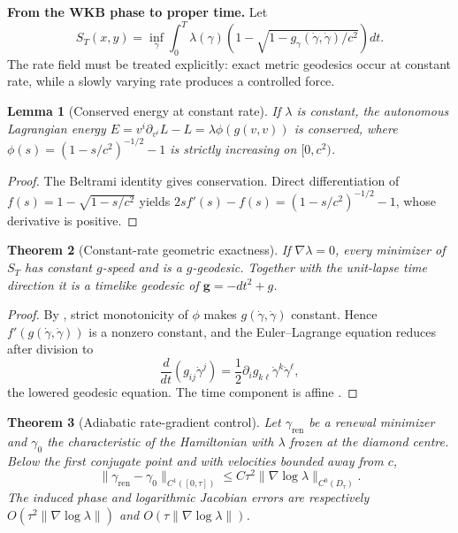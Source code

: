 \documentclass[11pt]{article}
\newtheorem{theorem}{Theorem}[section]
\newtheorem{lemma}[theorem]{Lemma}
\theoremstyle{definition}
\theoremstyle{remark}
\newcommand{\ren}{\mathrm{ren}}
\begin{document}
\medskip
\noindent\textbf{From the WKB phase to proper time.}
Let
\[
 S_T(x,y)=\inf_\gamma\int_0^T
 \lambda(\gamma)\left(1-\sqrt{1-g_\gamma(\dot\gamma,\dot\gamma)/c^2}\right)dt.
\]
The rate field must be treated explicitly: exact metric geodesics occur at constant
rate, while a slowly varying rate produces a controlled force.

\begin{lemma}[Conserved energy at constant rate]
\label{lem:constant-rate-energy}
If $\lambda$ is constant, the autonomous Lagrangian energy
$E=v^i\partial_{v^i}L-L=\lambda\phi(g(v,v))$ is conserved, where
$\phi(s)=(1-s/c^2)^{-1/2}-1$ is strictly increasing on $[0,c^2)$.
\end{lemma}

\begin{proof}
The Beltrami identity gives conservation.  Direct differentiation of
$f(s)=1-\sqrt{1-s/c^2}$ yields
$2sf'(s)-f(s)=(1-s/c^2)^{-1/2}-1$, whose derivative is positive.
\end{proof}

\begin{theorem}[Constant-rate geometric exactness]
\label{thm:constant-rate-geodesics}
If $\nabla\lambda=0$, every minimizer of $S_T$ has constant $g$-speed and is a
$g$-geodesic.  Together with the unit-lapse time direction it is a timelike
geodesic of $\mathbf g=-dt^2+g$.
\end{theorem}

\begin{proof}
By , strict monotonicity of $\phi$ makes
$g(\dot\gamma,\dot\gamma)$ constant.  Hence $f'(g(\dot\gamma,\dot\gamma))$ is a
nonzero constant, and the Euler--Lagrange equation reduces after division to
\[
 \frac d{dt}(g_{ij}\dot\gamma^j)
 =\frac12\partial_i g_{k\ell}\dot\gamma^k\dot\gamma^\ell,
\]
the lowered geodesic equation.  The time component is affine
\cite{Arnold}.
\end{proof}

\begin{theorem}[Adiabatic rate-gradient control]
\label{thm:adiabatic-rate}
Let $\gamma_{\ren}$ be a renewal minimizer and $\gamma_0$ the characteristic of
the Hamiltonian with $\lambda$ frozen at the diamond centre.  Below the first
conjugate point and with velocities bounded away from $c$,
\[
 \|\gamma_{\ren}-\gamma_0\|_{C^1([0,\tau])}
 \le C\tau^2\|\nabla\log\lambda\|_{C^0(D_\tau)}.
\]
The induced phase and logarithmic Jacobian errors are respectively
$O(\tau^2\|\nabla\log\lambda\|)$ and
$O(\tau\|\nabla\log\lambda\|)$.
\end{theorem}
\end{document}

